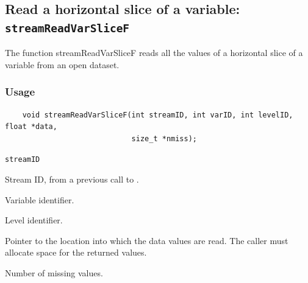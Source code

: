 \subsection{Read a horizontal slice of a variable: \texttt{streamReadVarSliceF}}
\label{streamReadVarSliceF}

The function streamReadVarSliceF reads all the values of a horizontal slice of a variable
from an open dataset.
\subsubsection*{Usage}

\begin{verbatim}
    void streamReadVarSliceF(int streamID, int varID, int levelID, float *data, 
                             size_t *nmiss);
\end{verbatim}

\hspace*{4mm}\begin{minipage}[]{15cm}
\begin{deflist}{\texttt{streamID}\ }
\item[\texttt{streamID}]
Stream ID, from a previous call to {}.
\item[\texttt{varID}]
Variable identifier.
\item[\texttt{levelID}]
Level identifier.
\item[\texttt{data}]
Pointer to the location into which the data values are read.
                     The caller must allocate space for the returned values.
\item[\texttt{nmiss}]
Number of missing values.

\end{deflist}
\end{minipage}
